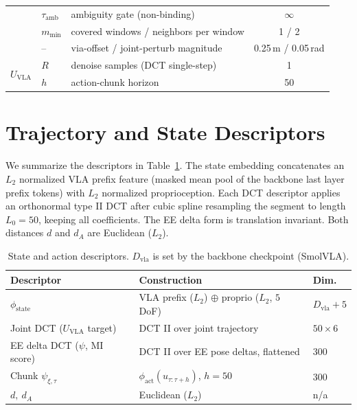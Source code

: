\documentclass{article}
\begin{document}
\begin{table}[h]
\begin{tabular}{lllc}
 & $\tau_{\mathrm{amb}}$ & ambiguity gate (non-binding)                   & $\infty$ \\
 & $m_{\min}$        & covered windows / neighbors per window             & 1 / 2 \\
 & --                & via-offset / joint-perturb magnitude               & 0.25\,m / 0.05\,rad \\
\midrule
\multirow{2}{*}{$U_{\mathrm{VLA}}$}
 & $R$               & denoise samples (DCT single-step)                  & 1 \\
 & $h$               & action-chunk horizon                               & 50 \\
\bottomrule
\end{tabular}
\end{table}

\section{Trajectory and State Descriptors}
\label{app:descriptors}

We summarize the descriptors in Table~\ref{tab:descriptors}. The state embedding
concatenates an $L_2$ normalized VLA prefix feature (masked mean pool of the
backbone last layer prefix tokens) with $L_2$ normalized proprioception. Each DCT
descriptor applies an orthonormal type II DCT after cubic spline resampling the
segment to length $L_0{=}50$, keeping all coefficients. The EE delta form is
translation invariant. Both distances $d$ and $d_A$ are Euclidean ($L_2$).

\begin{table}[h]
\centering
\caption{State and action descriptors. $D_{\mathrm{vla}}$ is set by the backbone checkpoint (SmolVLA).}
\label{tab:descriptors}
\small
\setlength{\tabcolsep}{6pt}
\begin{tabular}{lll}
\toprule
\textbf{Descriptor} & \textbf{Construction} & \textbf{Dim.} \\
\midrule
$\phi_{\mathrm{state}}$ & VLA prefix ($L_2$) $\oplus$ proprio ($L_2$, $5$ DoF) & $D_{\mathrm{vla}}{+}5$ \\
Joint DCT ($U_{\mathrm{VLA}}$ target) & DCT II over joint trajectory & $50{\times}6$ \\
EE delta DCT ($\psi$, MI score) & DCT II over EE pose deltas, flattened & $300$ \\
Chunk $\psi_{\xi,\tau}$ & $\phi_{\mathrm{act}}(u_{\tau:\tau+h})$, $h{=}50$ & $300$ \\
$d,\ d_A$ & Euclidean ($L_2$) & n/a \\
\bottomrule
\end{tabular}
\end{table}
\end{document}
